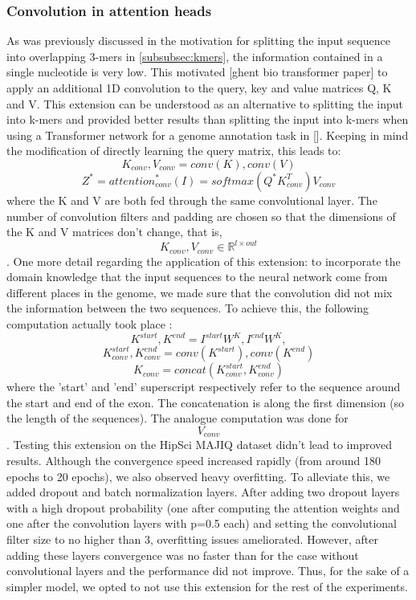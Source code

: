 \subsubsection{Convolution in attention heads}
As was previously discussed in the motivation for splitting the input sequence into overlapping 3-mers in \ref{subsubsec:kmers}, the information contained in a single nucleotide is very low. This motivated [ghent bio transformer paper] to apply an additional 1D convolution to the query, key and value matrices Q, K and V. This extension can be understood as an alternative to splitting the input into k-mers and provided better results than splitting the input into k-mers when using a Transformer network for a genome annotation task in [].
Keeping in mind the modification of directly learning the query matrix, this leads to:
$$K_{conv}, V_{conv} = conv(K), conv(V)$$
$$Z^* = {attention}_{conv}^*(I) = softmax({Q}^*K_{conv}^T)V_{conv}$$
where the K and V are both fed through the same convolutional layer.
The number of convolution filters and padding are chosen so that the dimensions of the K and V matrices don't change, that is, $$K_{conv}, V_{conv} \in \mathbb{R}^{l \times out}$$.
One more detail regarding the application of this extension: to incorporate the domain knowledge that the input sequences to the neural network come from different places in the genome, we made sure that the convolution did not mix the information between the two sequences. To achieve this, the following computation actually took place :
$$K^{start}, K^{end} = I^{start}W^K, I^{end}W^K,$$
$$K^{start}_{conv}, K^{end}_{conv} = conv(K^{start}), conv(K^{end})$$
$$K_{conv} = concat(K^{start}_{conv}, K^{end}_{conv})$$
where the 'start' and 'end' superscript respectively refer to the sequence around the start and end of the exon. The concatenation is along the first dimension (so the length of the sequences). The analogue computation was done for $$V_{conv}$$.
Testing this extension on the HipSci MAJIQ dataset didn't lead to improved results. Although the convergence speed increased rapidly (from around 180 epochs to 20 epochs), we also observed heavy overfitting. To alleviate this, we added dropout and batch normalization layers. After adding two dropout layers with a high dropout probability (one after computing the attention weights and one after the convolution layers with p=0.5 each) and setting the convolutional filter size to no higher than 3, overfitting issues ameliorated. However, after adding these layers convergence was no faster than for the case without convolutional layers and the performance did not improve. Thus, for the sake of a simpler model, we opted to not use this extension for the rest of the experiments.
